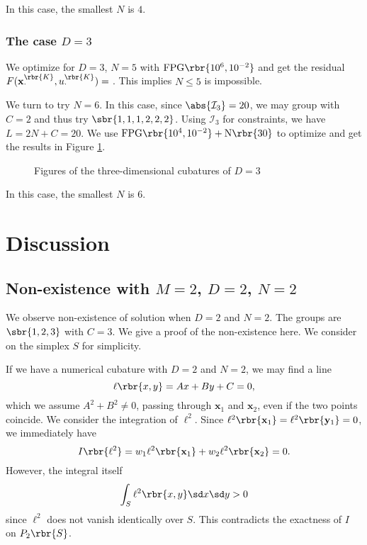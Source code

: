 \documentclass[english, nochinese]{pnote}
\begin{document}
In this case, the smallest $N$ is $4$.

\subsubsection{The case $ D = 3 $}

We optimize for $ D = 3 $, $ N = 5 $ with $ \text{FPG} \rbr{ 10^6, 10^{-2} } $ and get the residual $ F ( \mathbf{x}_{\cdot}^{\rbr{K}}, u_{\cdot}^{\rbr{K}} ) = \text{} $. This implies $ N \le 5 $ is impossible.

We turn to try $ N = 6 $. In this case, since $ \abs{\mathcal{I}_3} = 20 $, we may group with $ C = 2 $ and thus try $ \sbr{ 1, 1, 1, 2, 2, 2 } $. Using $\mathcal{I}_3$ for constraints, we have $ L = 2 N + C = 20 $. We use $ \text{FPG} \rbr{ 10^4, 10^{-2} } + \text{N} \rbr{30} $ to optimize and get the results in Figure \ref{Fig:M3D3}.

\begin{figure}[htbp]
\centering
\scalebox{0.75}{}
\scalebox{0.75}{}
\caption{Figures of the three-dimensional cubatures of $ D = 3 $}
\label{Fig:M3D3}
\end{figure}

In this case, the smallest $N$ is $6$.

\section{Discussion}

\subsection{Non-existence with $ M = 2 $, $ D = 2 $, $ N = 2 $}

We observe non-existence of solution when $ D = 2 $ and $ N = 2 $. The groups are $ \sbr{ 1, 2, 3 } $ with $ C = 3 $. We give a proof of the non-existence here. We consider on the simplex $S$ for simplicity.

If we have a numerical cubature with $ D = 2 $ and $ N = 2 $, we may find a line
\begin{equation}
\ell \rbr{ x, y } = A x + B y + C = 0,
\end{equation}
which we assume $ A^2 + B^2 \neq 0 $, passing through $\mathbf{x}_1$ and $\mathbf{x}_2$, even if the two points coincide. We consider the integration of $\ell^2$. Since $ \ell^2 \rbr{\mathbf{x}_1} = \ell^2 \rbr{\mathbf{y}_1} = 0 $, we immediately have
\begin{equation}
I \rbr{\ell^2} = w_1 \ell^2 \rbr{\mathbf{x}_1} + w_2 \ell^2 \rbr{\mathbf{x}_2} = 0.
\end{equation}
However, the integral itself
\begin{equation}
\int_S \ell^2 \rbr{ x, y } \sd x \sd y > 0
\end{equation}
since $\ell^2$ does not vanish identically over $S$. This contradicts the exactness of $I$ on $ P_2 \rbr{S} $.
\end{document}
